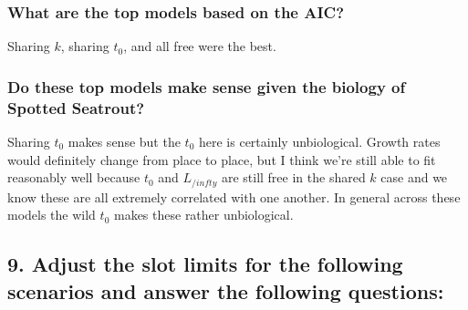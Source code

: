 \documentclass[
]{article}
\begin{document}
\hypertarget{what-are-the-top-models-based-on-the-aic}{%
\subsubsection{What are the top models based on the
AIC?}\label{what-are-the-top-models-based-on-the-aic}}

Sharing \(k\), sharing \(t_0\), and all free were the best.

\hypertarget{do-these-top-models-make-sense-given-the-biology-of-spotted-seatrout}{%
\subsubsection{Do these top models make sense given the biology of
Spotted
Seatrout?}\label{do-these-top-models-make-sense-given-the-biology-of-spotted-seatrout}}

Sharing \(t_0\) makes sense but the \(t_0\) here is certainly
unbiological. Growth rates would definitely change from place to place,
but I think we're still able to fit reasonably well because \(t_0\) and
\(L_{/infty}\) are still free in the shared \(k\) case and we know these
are all extremely correlated with one another. In general across these
models the wild \(t_0\) makes these rather unbiological.

\hypertarget{adjust-the-slot-limits-for-the-following-scenarios-and-answer-the-following-questions}{%
\subsection{9. Adjust the slot limits for the following scenarios and
answer the following
questions:}\label{adjust-the-slot-limits-for-the-following-scenarios-and-answer-the-following-questions}}
\end{document}
